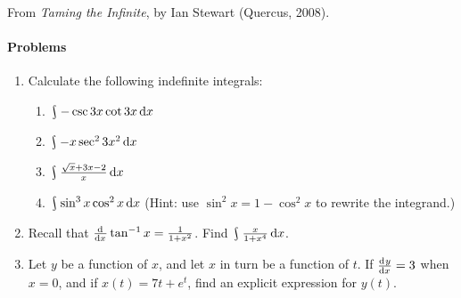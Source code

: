 \begin{flushright}
  From \textit{Taming the Infinite}, by Ian Stewart (Quercus, 2008).
\end{flushright}


\paragraph{Problems}
\begin{enumerate}
  \item Calculate the following indefinite integrals:
    \begin{enumerate}
      \item $ \rint -\csc 3x \cot 3x \dif{x} $
      \item $ \rint -x\sec^2 3x^2 \dif{x} $
      \item $ \rint \frac{\sqrt{x} + 3x - 2}{x} \dif{x} $
      \item $ \rint \sin^3 x \cos^2 x \dif{x} $ (Hint: use $ \sin^2 x = 1 - \cos^2 x $ to rewrite the integrand.)
    \end{enumerate}
  \item Recall that $ \od{}{x} \tan^{-1} x = \frac{1}{1 + x^2} $. Find $ \rint \frac{x}{1 + x^4} \dif{x} $.
  \item Let $ y $ be a function of $ x $, and let $ x $ in turn be a function of $ t $. If $ \od{y}{x} = 3 $ when $ x = 0 $,
        and if $ x(t) = 7t + e^t $, find an explicit expression for $ y(t) $.
\end{enumerate}
